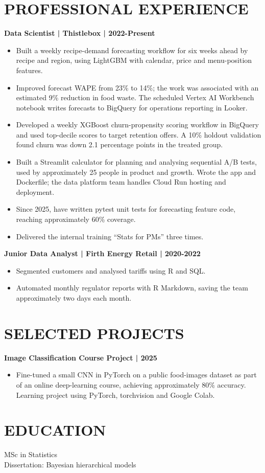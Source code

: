 \documentclass[11pt,a4paper]{article}
\begin{document}
\section*{PROFESSIONAL EXPERIENCE}
\textbf{Data Scientist | Thistlebox | 2022-Present}
\begin{itemize}
\item Built a weekly recipe-demand forecasting workflow for six weeks ahead by recipe and region, using LightGBM with calendar, price and menu-position features.
\item Improved forecast WAPE from 23\% to 14\%; the work was associated with an estimated 9\% reduction in food waste. The scheduled Vertex AI Workbench notebook writes forecasts to BigQuery for operations reporting in Looker.
\item Developed a weekly XGBoost churn-propensity scoring workflow in BigQuery and used top-decile scores to target retention offers. A 10\% holdout validation found churn was down 2.1 percentage points in the treated group.
\item Built a Streamlit calculator for planning and analysing sequential A/B tests, used by approximately 25 people in product and growth. Wrote the app and Dockerfile; the data platform team handles Cloud Run hosting and deployment.
\item Since 2025, have written pytest unit tests for forecasting feature code, reaching approximately 60\% coverage.
\item Delivered the internal training “Stats for PMs” three times.
\end{itemize}

\textbf{Junior Data Analyst | Firth Energy Retail | 2020-2022}
\begin{itemize}
\item Segmented customers and analysed tariffs using R and SQL.
\item Automated monthly regulator reports with R Markdown, saving the team approximately two days each month.
\end{itemize}

\section*{SELECTED PROJECTS}
\textbf{Image Classification Course Project | 2025}
\begin{itemize}
\item Fine-tuned a small CNN in PyTorch on a public food-images dataset as part of an online deep-learning course, achieving approximately 80\% accuracy. Learning project using PyTorch, torchvision and Google Colab.
\end{itemize}

\section*{EDUCATION}
MSc in Statistics\\
Dissertation: Bayesian hierarchical models
\end{document}
